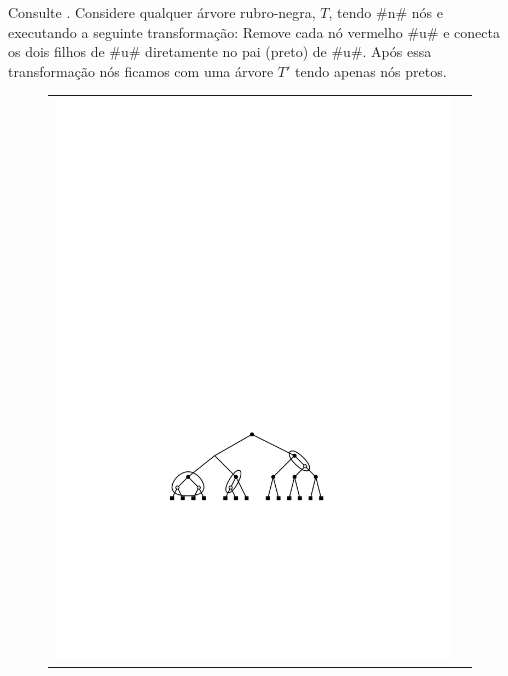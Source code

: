 Consulte .
Considere qualquer árvore rubro-negra, $T$, tendo #n# nós e executando a
seguinte transformação: Remove cada nó vermelho #u# e conecta os dois
filhos de #u# diretamente no pai (preto) de #u#. Após essa transformação
nós ficamos com uma árvore $T'$ tendo apenas nós pretos.
\begin{figure}
	\begin{center}
		\begin{tabular}{cc}
			\includegraphics[scale=0.90909]{figs/24rb-3} \\

\end{tabular}
\end{center}
\end{figure}
